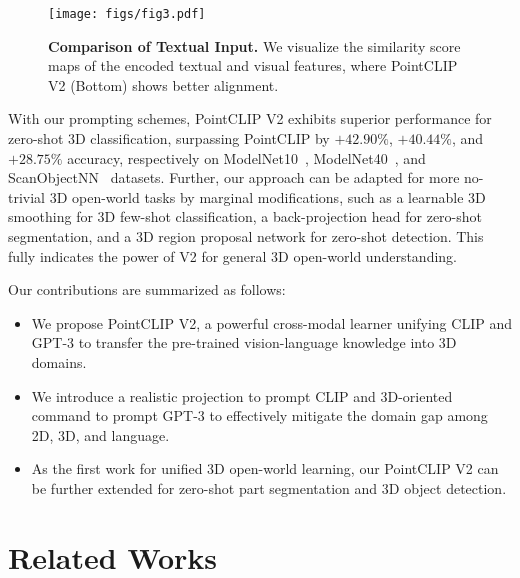 \documentclass[10pt,twocolumn,letterpaper]{article}
\begin{document}
\begin{figure}[t!]
\centering
\texttt{[image: figs/fig3.pdf]}
\caption{\textbf{Comparison of Textual Input.} We visualize the similarity score maps of the encoded textual and visual features, where PointCLIP V2 (Bottom) shows better alignment.}
\vspace{-0.3cm}
\label{fig3}
\end{figure}

With our prompting schemes, PointCLIP V2 exhibits superior performance for zero-shot 3D classification, surpassing PointCLIP by $+42.90\%$, $+40.44\%$, and $+28.75\%$ accuracy, respectively on ModelNet10~\cite{wu20153d}, ModelNet40~\cite{wu20153d}, and ScanObjectNN~\cite{uy2019revisiting} datasets. Further, our approach can be adapted for more no-trivial 3D open-world tasks by marginal modifications, such as a learnable 3D smoothing for 3D few-shot classification, a back-projection head for zero-shot segmentation, and a 3D region proposal network for zero-shot detection. This fully indicates the power of V2 for general 3D open-world understanding.

Our contributions are summarized as follows:

\begin{itemize}
    \item We propose PointCLIP V2, a powerful cross-modal learner unifying CLIP and GPT-3 to transfer the pre-trained vision-language knowledge into 3D domains. 
    
    \item We introduce a realistic projection to prompt CLIP and 3D-oriented command to prompt GPT-3 to effectively mitigate the domain gap among 2D, 3D, and language.
    
    \item As the first work for unified 3D open-world learning, our PointCLIP V2 can be further extended for zero-shot part segmentation and 3D object detection.
\end{itemize}


\section{Related Works}
\label{sec:related work}
\end{document}
